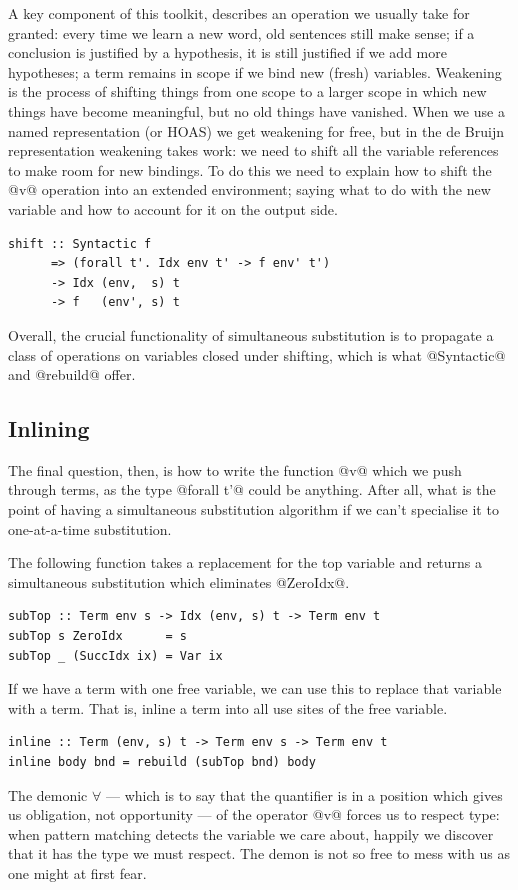 A key component of this toolkit,  describes an operation we
usually take for granted: every time we learn a new word, old sentences still
make sense; if a conclusion is justified by a hypothesis, it is still justified
if we add more hypotheses; a term remains in scope if we bind new (fresh)
variables. Weakening is the process of shifting things from one scope to a
larger scope in which new things have become meaningful, but no old things have
vanished. When we use a named representation (or HOAS) we get weakening
for free, but in the de Bruijn representation weakening takes
work: we need to shift all the variable references to make room for new
bindings. To do this we need to explain how to shift the @v@ operation into
an extended environment; saying what to do with the new variable and how to
account for it on the output side.
%
\begin{lstlisting}[style=haskell]
shift :: Syntactic f
      => (forall t'. Idx env t' -> f env' t')
      -> Idx (env,  s) t
      -> f   (env', s) t
\end{lstlisting}
%
Overall, the crucial functionality of simultaneous substitution is to propagate
a class of operations on variables closed under shifting, which is what
@Syntactic@ and @rebuild@ offer.


\subsection{Inlining}
\label{sec:inlining}

The final question, then, is how to write the function @v@ which we push
through terms, as the type @forall t'@ could be anything. After all, what
is the point of having a simultaneous substitution algorithm if we can't
specialise it to one-at-a-time substitution.

The following function takes a replacement for the top variable and returns a
simultaneous substitution which eliminates @ZeroIdx@.
%
\begin{lstlisting}[style=haskell
    ,name=inlining
    ,caption={[A simultaneous substitution to inline terms]}]
subTop :: Term env s -> Idx (env, s) t -> Term env t
subTop s ZeroIdx      = s
subTop _ (SuccIdx ix) = Var ix
\end{lstlisting}
%
If we have a term with one free variable, we can use this to replace that
variable with a term. That is, inline a term into all use sites of the free
variable.
%
\begin{lstlisting}[style=haskell,
    name=inlining,
    caption={A simultaneous substitution to inline terms}]
inline :: Term (env, s) t -> Term env s -> Term env t
inline body bnd = rebuild (subTop bnd) body
\end{lstlisting}
%
The demonic $\forall$ --- which is to say that the quantifier is in a position
which gives us obligation, not opportunity --- of the operator @v@ forces
us to respect type: when pattern matching detects the variable we care about,
happily we discover that it has the type we must respect. The demon is not so
free to mess with us as one might at first fear.

